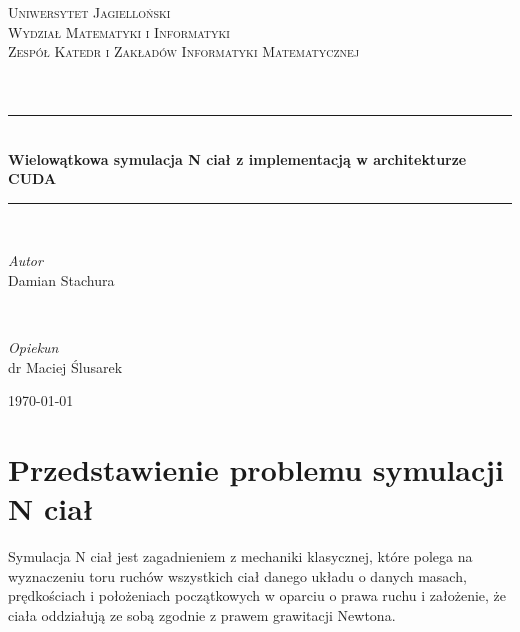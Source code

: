 \documentclass[14pt,twoside,a4paper]{article}
\begin{document}
\begin{titlepage}
	\newcommand{\HRule}{\rule{\linewidth}{0.5mm}}
	
	\center
	
	\textsc{\Large Uniwersytet  Jagielloński\\
			 Wydział Matematyki i Informatyki\\
    		 Zespół Katedr i Zakładów Informatyki Matematycznej}\\[1.5cm]
	
	\textsc{\Large}\\[0.5cm]
	
	\textsc{\Large}\\[0.5cm]
	
	\HRule\\[0.4cm]
		
	{\huge\bfseries Wielowątkowa symulacja N ciał z implementacją w architekturze CUDA}\\[0.4cm] %
	
	\HRule\\[1.5cm]
	
	\begin{minipage}{0.4\textwidth}
		\begin{flushleft}
			\large
			\textit{Autor}\\
			Damian Stachura%
		\end{flushleft}
	\end{minipage}
	~
	\begin{minipage}{0.4\textwidth}
		\begin{flushright}
			\large
			\textit{Opiekun}\\
			dr Maciej Ślusarek %
		\end{flushright}
	\end{minipage}
	
	\vfill\vfill %
	
	{\large\today} %
	
\end{titlepage}

\newpage
\tableofcontents

\newpage

\section{\LARGE Przedstawienie problemu symulacji N ciał}
\bigskip
Symulacja N ciał jest zagadnieniem z mechaniki klasycznej, które polega na wyznaczeniu toru ruchów wszystkich ciał danego układu o danych masach, prędkościach i położeniach początkowych w oparciu o prawa ruchu i założenie, że ciała oddziałują ze sobą zgodnie z prawem grawitacji Newtona. \\
\end{document}
